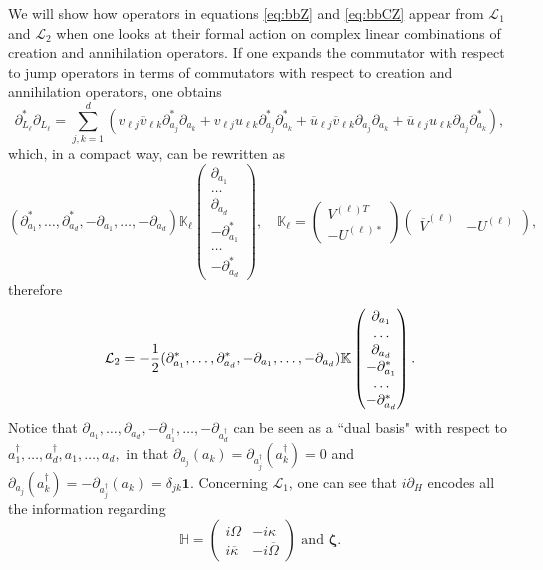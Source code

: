 \documentclass[preprint]{elsarticle}
\theoremstyle{definition}
\def\LL{\mathcal{L}}
\begin{document}
We will show how operators in equations \eqref{eq:bbZ} and \eqref{eq:bbCZ} appear from $\LL_1$ and $\LL_2$ when one looks at their formal action on complex linear combinations of creation and annihilation operators. If one expands the commutator with respect to jump operators in terms of commutators with respect to creation and annihilation operators, one obtains
$$
\partial_{L_\ell}^*\partial_{L_\ell}=\sum_{j,k=1}^{d}(v_{\ell j}\overline{v}_{\ell k}\partial^*_{a_j}\partial_{a_k}+v_{\ell j}u_{\ell k}\partial^*_{a_j}\partial^*_{a_k}+\overline{u}_{\ell j}  \overline{v}_{\ell k}\partial_{a_j}\partial_{a_k}+\overline{u}_{\ell j} u_{\ell k} \partial_{a_j}\partial^*_{a_k}),
$$
which, in a compact way, can be rewritten as
$$(\partial^*_{a_1}, \dots, \partial^*_{a_d}, -\partial_{a_1}, \dots, -\partial_{a_d}) \mathbb{K}_{\ell}\begin{pmatrix} \partial_{a_1}\\ \dots\\\partial_{a_d}\\ -\partial^*_{a_1}\\ \dots\\ -\partial^*_{a_d}\end{pmatrix}, \quad \mathbb{K}_{\ell}=\begin{pmatrix}V^{(\ell)T}\\ -U^{(\ell)*}\end{pmatrix}\begin{pmatrix}\overline{V}^{(\ell)} &-U^{(\ell)}\end{pmatrix},$$
therefore
$${\cal L}_2=-\frac{1}{2}(\partial^*_{a_1}, \dots, \partial^*_{a_d}, -\partial_{a_1}, \dots, -\partial_{a_d}) \mathbb{K}\begin{pmatrix} \partial_{a_1}\\ \dots\\\partial_{a_d}\\ -\partial^*_{a_1}\\ \dots\\ -\partial^*_{a_d}\end{pmatrix}.$$
Notice that $\partial_{a_1}, \dots, \partial_{a_d},-\partial_{a_1^\dagger}, \dots, -\partial_{a_d^\dagger}$ can be seen as a ``dual basis" with respect to $a_1^\dagger, \dots, a_d^\dagger, a_1, \dots, a_d,$ in that $\partial_{a_j}(a_k)=\partial_{a_j^\dagger}(a_k^\dagger)=0$ and $\partial_{a_j}(a^\dagger_k)=-\partial_{a_j^\dagger}(a_k)=\delta_{jk}\mathbf{1}.$ Concerning $\LL_1$, one can see that $i\partial_H$ encodes all the information regarding
$$\mathbb{H}=\begin{pmatrix} i\Omega & -i\kappa \\
i\overline{\kappa} & -i \overline{\Omega}\end{pmatrix} \text{ and } \boldsymbol{\zeta}.$$
\end{document}
